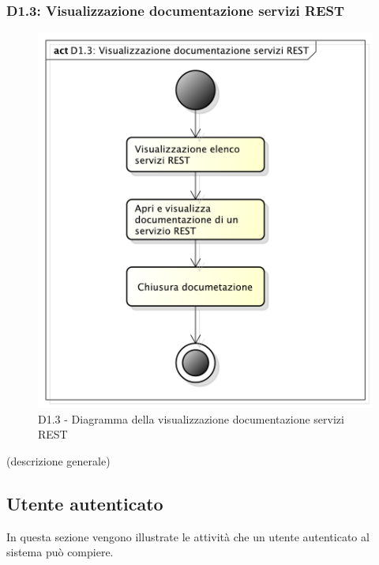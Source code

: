 		\subsubsection{D1.3: Visualizzazione documentazione servizi REST} %
		\label{ssub:visualizzazione_documentazione_servizi_rest}
		\begin{figure}[!htbp]
			\centering
			\centerline{\includegraphics[scale=0.45]{./images/D1_3.pdf}}
			\caption{D1.3 - Diagramma della visualizzazione documentazione servizi REST}
		\end{figure}
		\noindent
		[TO DO] (descrizione generale)


	\pagebreak
\clearpage \newpage

	\subsection{Utente autenticato} %
	\label{sub:utente_autenticato}
	In questa sezione vengono illustrate le attività che un utente autenticato al sistema può compiere.

